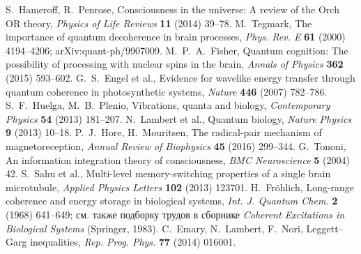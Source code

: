 \documentclass[12pt,a4paper]{article}
\begin{document}
\begin{thebibliography}{99}
S.~Hameroff, R.~Penrose, Consciousness in the universe: A review of the Orch OR theory, \emph{Physics of Life Reviews} \textbf{11} (2014) 39–78. %
M.~Tegmark, The importance of quantum decoherence in brain processes, \emph{Phys. Rev. E} \textbf{61} (2000) 4194–4206; arXiv:quant-ph/9907009.
M.~P.~A.~Fisher, Quantum cognition: The possibility of processing with nuclear spins in the brain, \emph{Annals of Physics} \textbf{362} (2015) 593–602.
G.~S.~Engel et al., Evidence for wavelike energy transfer through quantum coherence in photosynthetic systems, \emph{Nature} \textbf{446} (2007) 782–786.
S.~F.~Huelga, M.~B.~Plenio, Vibrations, quanta and biology, \emph{Contemporary Physics} \textbf{54} (2013) 181–207.
N.~Lambert et al., Quantum biology, \emph{Nature Physics} \textbf{9} (2013) 10–18.
P.~J.~Hore, H.~Mouritsen, The radical-pair mechanism of magnetoreception, \emph{Annual Review of Biophysics} \textbf{45} (2016) 299–344.
G.~Tononi, An information integration theory of consciousness, \emph{BMC Neuroscience} \textbf{5} (2004) 42.
S.~Sahu et al., Multi-level memory-switching properties of a single brain microtubule, \emph{Applied Physics Letters} \textbf{102} (2013) 123701.
H.~Fr\"ohlich, Long-range coherence and energy storage in biological systems, \emph{Int. J. Quantum Chem.} \textbf{2} (1968) 641–649; см. также подборку трудов в сборнике \emph{Coherent Excitations in Biological Systems} (Springer, 1983).
C.~Emary, N.~Lambert, F.~Nori, Leggett–Garg inequalities, \emph{Rep. Prog. Phys.} \textbf{77} (2014) 016001.
\end{thebibliography}
\end{document}

